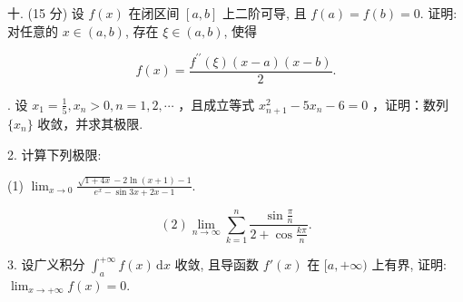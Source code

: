 \documentclass{examcollection}
\renewcommand{\displayformula}[1]{\[#1\]}
\begin{document}
{\begin{minipage}{\textwidth}
十. (15 分) 设 $f(x)$ 在闭区间 $[a, b]$ 上二阶可导, 且 $f(a) = f(b) = 0$. 证明: 对任意的 $x \in (a, b)$, 存在 $\xi \in (a, b)$, 使得\par
\displayformula{f (x) = \frac {f ^ {\prime \prime} (\xi) (x - a) (x - b)}{2}.}\par
{}. 设  $x_{1}=\frac{1}{5}, x_{n}>0, n=1,2,\cdots$ ，且成立等式  $x_{n+1}^{2}-5x_{n}-6=0$ ，证明：数列  $\{x_{n}\}$  收敛，并求其极限.\par
2. 计算下列极限:\par
(1) $\lim_{x\to 0}\frac{\sqrt{1 + 4x} - 2\ln(x + 1) - 1}{e^x - \sin 3x + 2x - 1}.$\par
\displayformula{(2) \lim _ {n \to \infty} \sum_ {k = 1} ^ {n} \frac {\sin {\frac {\pi}{n}}}{2 + \cos {\frac {k \pi}{n}}}.}\par
3. 设广义积分 $\int_{a}^{+\infty} f(x) \, \mathrm{d}x$ 收敛, 且导函数 $f'(x)$ 在 $[a, +\infty)$ 上有界, 证明: $\lim_{x \to +\infty} f(x) = 0$.\par
\end{minipage}}
\ifdim\dimexpr\ht\proofbox+\dp\proofbox\relax>\textheight
\noindent\resizebox{!}{\textheight}{\usebox{\proofbox}}\else\noindent\usebox{\proofbox}\fi\clearpage
\end{document}
